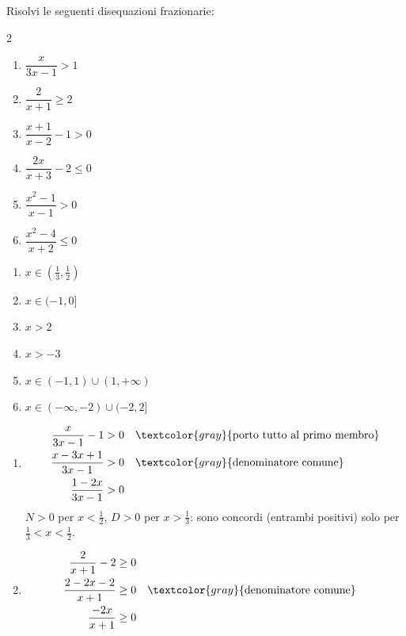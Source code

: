 \begin{question}[ID=2.3, subtitle={Disequazioni frazionarie con semplificazioni}, difficulty=media, tags={disequazioni frazionarie}]
Risolvi le seguenti disequazioni frazionarie:
\begin{multicols}{2}
\begin{enumerate}[leftmargin=3.2cm]
    \item $\dfrac{x}{3x-1} > 1$
    \item $\dfrac{2}{x+1} \geq 2$
    \item $\dfrac{x+1}{x-2} - 1 > 0$
    \item $\dfrac{2x}{x+3} - 2 \leq 0$
    \item $\dfrac{x^2-1}{x-1} > 0$
    \item $\dfrac{x^2-4}{x+2} \leq 0$
\end{enumerate}
\end{multicols}
\begin{solution}
\begin{enumerate}
    \item $x\in(\tfrac13,\tfrac12)$
    \item $x\in(-1,0]$
    \item $x>2$
    \item $x>-3$
    \item $x\in(-1,1)\cup(1,+\infty)$
    \item $x\in(-\infty,-2)\cup(-2,2]$
\end{enumerate}
\end{solution}
\begin{explanation}
\begin{enumerate}
    \item \[\begin{aligned}
    \dfrac{x}{3x-1}-1 &> 0 && \textcolor{gray}{\text{porto tutto al primo membro}}\\
    \dfrac{x-3x+1}{3x-1} &> 0 && \textcolor{gray}{\text{denominatore comune}}\\
    \dfrac{1-2x}{3x-1} &> 0
    \end{aligned}\]
    $N>0$ per $x<\tfrac12$, $D>0$ per $x>\tfrac13$: sono concordi (entrambi positivi) solo per $\tfrac13<x<\tfrac12$.
    \item \[\begin{aligned}
    \dfrac{2}{x+1}-2 &\geq 0\\
    \dfrac{2-2x-2}{x+1} &\geq 0 && \textcolor{gray}{\text{denominatore comune}}\\
    \dfrac{-2x}{x+1} &\geq 0\\

\end{aligned}\]
\end{enumerate}
\end{explanation}
\end{question}
